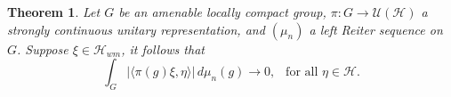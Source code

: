 \documentclass[11pt]{amsart}
\newtheorem{thm}{Theorem}[section]
\theoremstyle{definition}
\theoremstyle{myremark}
\numberwithin{equation}{section}
\newcommand{\CH}{\mathcal{H}}
\begin{document}
\begin{thm}\label{thm:weak-mixing-Reiter}
Let $G$ be an amenable locally compact group, $\pi:G\to \mathcal{U(H)}$ a strongly
continuous unitary representation, and $(\mu_n)$ a left Reiter sequence on
$G$. Suppose $ \xi \in \CH_{ wm} $, it follows that
$$ \int_G |\langle \pi(g)\xi,\eta\rangle|\,d\mu_n(g)
    \longrightarrow 0, ~~ \text{ for all } \eta \in \CH.$$
    
\end{thm}
\end{document}
